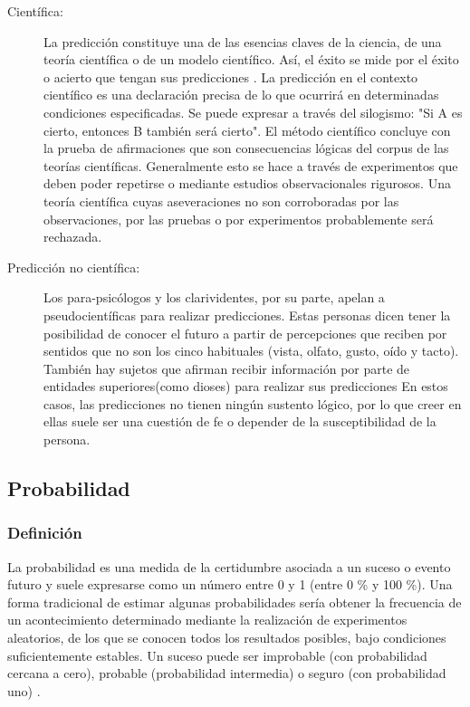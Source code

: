 \begin{description}
	\item [Científica:]
	\vskip 0.1cm 
	La predicción constituye una de las esencias claves de la ciencia, de una teoría científica o de un modelo científico. Así, el éxito se mide por el éxito o acierto que tengan sus predicciones \citep{mora_prediccion}.
	\vskip 0.1cm 
	La  predicción  en  el  contexto  científico  es  una  declaración  precisa  de  lo  que  ocurrirá  en determinadas  condiciones  especificadas.  Se  puede  expresar  a  través  del  silogismo:  "Si  A  es cierto, entonces B también será cierto".
	\vskip 0.1cm 
	El método científico concluye con la prueba de afirmaciones que son consecuencias lógicas del corpus de las teorías científicas. Generalmente esto se hace a través de experimentos que deben poder repetirse o mediante estudios observacionales rigurosos.
	\vskip 0.1cm 
	Una teoría científica cuyas aseveraciones no son corroboradas por las observaciones, por las pruebas o por experimentos probablemente será rechazada.
	 
	\item [Predicción no científica:]
	\vskip 0.1cm 
	Los para-psicólogos y los clarividentes, por su parte, apelan a pseudocientíficas para realizar predicciones. Estas personas dicen tener la posibilidad de conocer el futuro a partir de percepciones que reciben por sentidos que no son los cinco habituales (vista, olfato, gusto, oído y tacto). También hay sujetos que afirman recibir información por parte de entidades superiores(como dioses) para realizar sus predicciones \citep{julian_maria}
	\vskip 0.1cm 
	En estos casos, las predicciones no tienen ningún sustento lógico, por lo que creer en ellas suele ser una cuestión de fe o depender de la susceptibilidad de la persona.
	
\end{description}	
	

\subsection{Probabilidad}

\subsubsection{Definición}

La probabilidad es una medida de la certidumbre asociada a un suceso o evento futuro y suele expresarse como un número entre 0 y 1 (entre 0 \% y 100 \%). 
\vskip 0.1cm 
Una forma tradicional de estimar algunas probabilidades sería obtener la frecuencia de un acontecimiento determinado mediante la realización de experimentos aleatorios, de los que se conocen todos los resultados posibles, bajo condiciones suficientemente estables. Un suceso puede ser improbable (con probabilidad cercana a cero), probable (probabilidad intermedia) o seguro (con probabilidad uno) \citep{loeve}.

